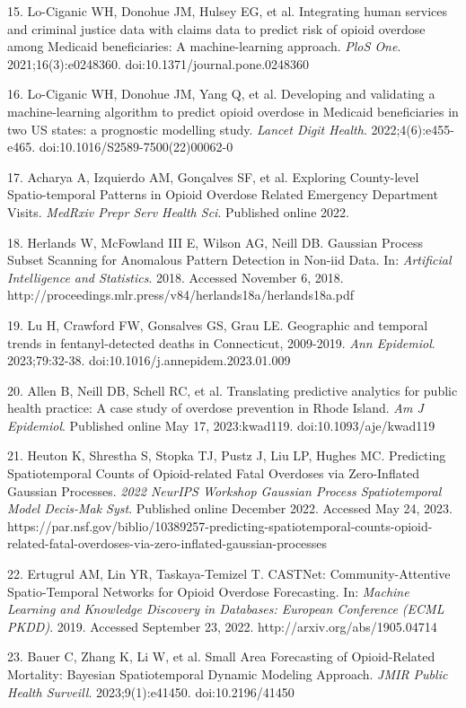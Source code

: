 15. Lo-Ciganic WH, Donohue JM, Hulsey EG, et al. Integrating human services and criminal justice data with claims data to predict risk of opioid overdose among Medicaid beneficiaries: A machine-learning approach. \emph{PloS One}. 2021;16(3):e0248360. doi:10.1371/journal.pone.0248360

16. Lo-Ciganic WH, Donohue JM, Yang Q, et al. Developing and validating a machine-learning algorithm to predict opioid overdose in Medicaid beneficiaries in two US states: a prognostic modelling study. \emph{Lancet Digit Health}. 2022;4(6):e455-e465. doi:10.1016/S2589-7500(22)00062-0

17. Acharya A, Izquierdo AM, Gonçalves SF, et al. Exploring County-level Spatio-temporal Patterns in Opioid Overdose Related Emergency Department Visits. \emph{MedRxiv Prepr Serv Health Sci}. Published online 2022.

18. Herlands W, McFowland III E, Wilson AG, Neill DB. Gaussian Process Subset Scanning for Anomalous Pattern Detection in Non-iid Data. In: \emph{Artificial Intelligence and Statistics}. 2018. Accessed November 6, 2018. http://proceedings.mlr.press/v84/herlands18a/herlands18a.pdf

19. Lu H, Crawford FW, Gonsalves GS, Grau LE. Geographic and temporal trends in fentanyl-detected deaths in Connecticut, 2009-2019. \emph{Ann Epidemiol}. 2023;79:32-38. doi:10.1016/j.annepidem.2023.01.009

20. Allen B, Neill DB, Schell RC, et al. Translating predictive analytics for public health practice: A case study of overdose prevention in Rhode Island. \emph{Am J Epidemiol}. Published online May 17, 2023:kwad119. doi:10.1093/aje/kwad119

21. Heuton K, Shrestha S, Stopka TJ, Pustz J, Liu LP, Hughes MC. Predicting Spatiotemporal Counts of Opioid-related Fatal Overdoses via Zero-Inflated Gaussian Processes. \emph{2022 NeurIPS Workshop Gaussian Process Spatiotemporal Model Decis-Mak Syst}. Published online December 2022. Accessed May 24, 2023. https://par.nsf.gov/biblio/10389257-predicting-spatiotemporal-counts-opioid-related-fatal-overdoses-via-zero-inflated-gaussian-processes

22. Ertugrul AM, Lin YR, Taskaya-Temizel T. CASTNet: Community-Attentive Spatio-Temporal Networks for Opioid Overdose Forecasting. In: \emph{Machine Learning and Knowledge Discovery in Databases: European Conference (ECML PKDD)}. 2019. Accessed September 23, 2022. http://arxiv.org/abs/1905.04714

23. Bauer C, Zhang K, Li W, et al. Small Area Forecasting of Opioid-Related Mortality: Bayesian Spatiotemporal Dynamic Modeling Approach. \emph{JMIR Public Health Surveill}. 2023;9(1):e41450. doi:10.2196/41450

